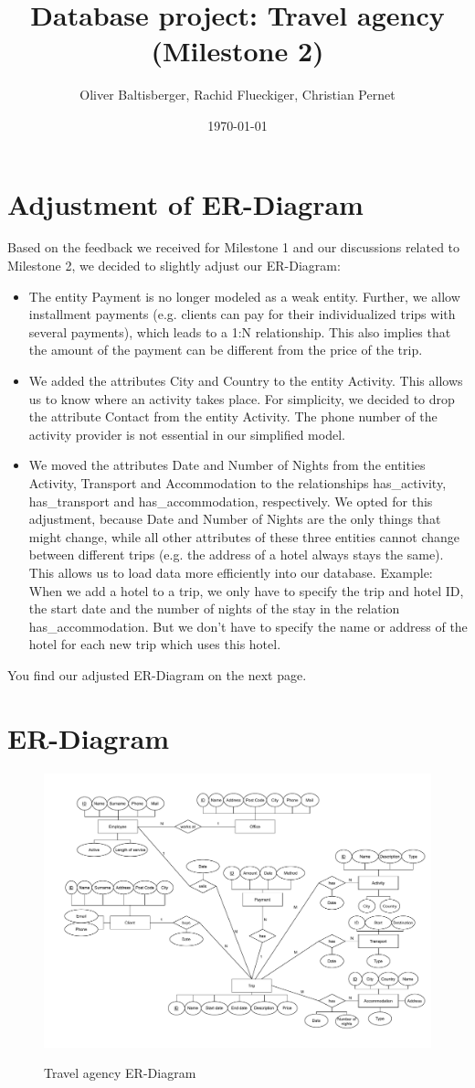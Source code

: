 \documentclass{article}
\title{Database project: Travel agency \\ (Milestone 2)}
\author{Oliver Baltisberger, Rachid Flueckiger, Christian Pernet}
\date{\today}
\begin{document}
	\maketitle
	
	\section*{Adjustment of ER-Diagram}
	Based on the feedback  we received for Milestone 1 and our discussions related to Milestone 2, we decided to slightly adjust our ER-Diagram:
	\begin{itemize}
		\item The entity Payment is no longer modeled as a weak entity. Further, we allow installment payments (e.g. clients can pay for their individualized trips with several payments), which leads to a 1:N relationship.
		This also implies that the amount of the payment can be different from the price of the trip.
		\item We added the attributes City and Country to the entity Activity. This allows us to know where an activity takes place.
		For simplicity, we decided to drop the attribute Contact from the entity Activity. The phone number of the activity provider is not essential in our simplified model.
		\item We moved the attributes Date and Number of Nights from the entities Activity, Transport and Accommodation to the relationships has\_activity, has\_transport and has\_accommodation, respectively.
		We opted for this adjustment, because Date and Number of Nights are the only things that might change, while all other attributes of these three entities cannot change between different trips (e.g. the address of a hotel always stays the same).
		This allows us to load data more efficiently into our database.
		Example: When we add a hotel to a trip, we only have to specify the trip and hotel ID, the start date and the number of nights of the stay in the relation has\_accommodation.
		But we don't have to specify the name or address of the hotel for each new trip which uses this hotel.
	\end{itemize}
	
You find our adjusted ER-Diagram on the next page.
	\newpage
	
	\section*{ER-Diagram}
	\begin{figure}[htbp]
		\centering
			\includegraphics[width=1.15\textwidth, angle=90]{../Diagramm.pdf}
		\label{ER-Model}
		\caption{Travel agency ER-Diagram}
	\end{figure}
	
\end{document}
